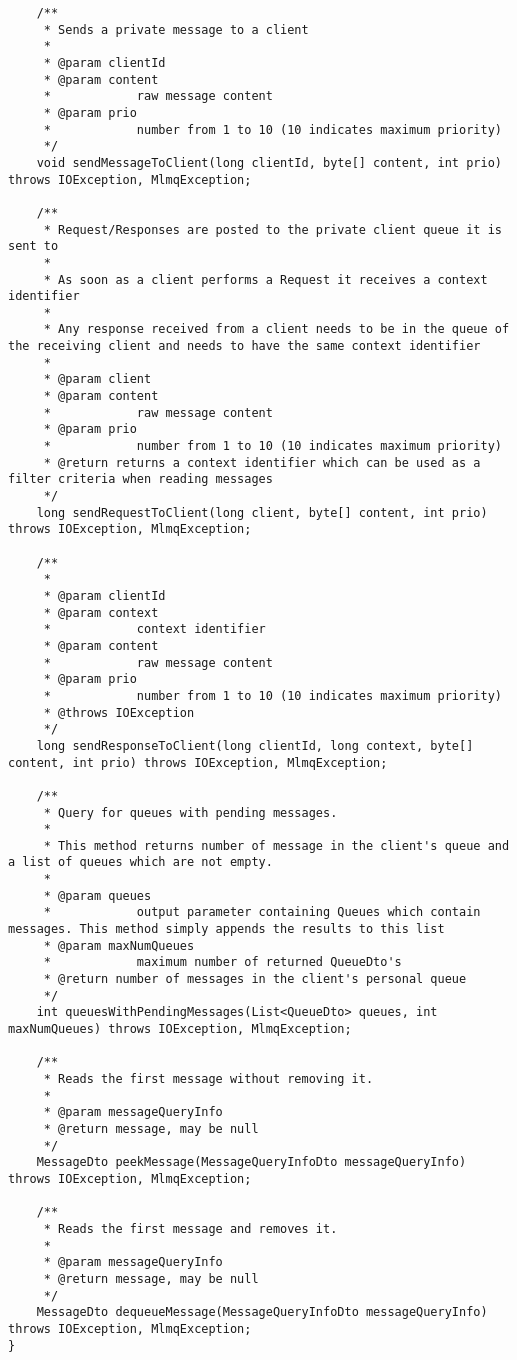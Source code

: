 \documentclass[milestone1.tex]{subfiles}
\begin{document}
\begin{lstlisting}
	/**
	 * Sends a private message to a client
	 * 
	 * @param clientId
	 * @param content
	 *            raw message content
	 * @param prio
	 *            number from 1 to 10 (10 indicates maximum priority)
	 */
	void sendMessageToClient(long clientId, byte[] content, int prio) throws IOException, MlmqException;

	/**
	 * Request/Responses are posted to the private client queue it is sent to
	 * 
	 * As soon as a client performs a Request it receives a context identifier
	 * 
	 * Any response received from a client needs to be in the queue of the receiving client and needs to have the same context identifier
	 * 
	 * @param client
	 * @param content
	 *            raw message content
	 * @param prio
	 *            number from 1 to 10 (10 indicates maximum priority)
	 * @return returns a context identifier which can be used as a filter criteria when reading messages
	 */
	long sendRequestToClient(long client, byte[] content, int prio) throws IOException, MlmqException;

	/**
	 * 
	 * @param clientId
	 * @param context
	 *            context identifier
	 * @param content
	 *            raw message content
	 * @param prio
	 *            number from 1 to 10 (10 indicates maximum priority)
	 * @throws IOException
	 */
	long sendResponseToClient(long clientId, long context, byte[] content, int prio) throws IOException, MlmqException;

	/**
	 * Query for queues with pending messages.
	 * 
	 * This method returns number of message in the client's queue and a list of queues which are not empty.
	 * 
	 * @param queues
	 *            output parameter containing Queues which contain messages. This method simply appends the results to this list
	 * @param maxNumQueues
	 *            maximum number of returned QueueDto's
	 * @return number of messages in the client's personal queue
	 */
	int queuesWithPendingMessages(List<QueueDto> queues, int maxNumQueues) throws IOException, MlmqException;

	/**
	 * Reads the first message without removing it.
	 * 
	 * @param messageQueryInfo
	 * @return message, may be null
	 */
	MessageDto peekMessage(MessageQueryInfoDto messageQueryInfo) throws IOException, MlmqException;

	/**
	 * Reads the first message and removes it.
	 * 
	 * @param messageQueryInfo
	 * @return message, may be null
	 */
	MessageDto dequeueMessage(MessageQueryInfoDto messageQueryInfo) throws IOException, MlmqException;
}

\end{lstlisting}
\end{document}
